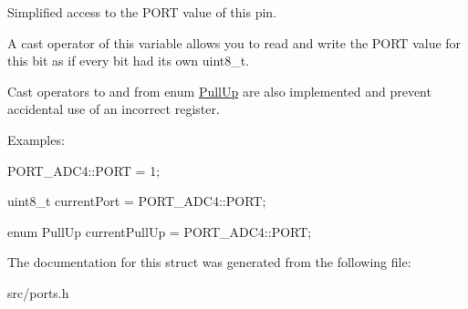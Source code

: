 Simplified access to the P\+O\+RT value of this pin. 

A cast operator of this variable allows you to read and write the P\+O\+RT value for this bit as if every bit had its own uint8\+\_\+t.

Cast operators to and from enum \hyperlink{namespaceALIBVR__NAMESPACE__PREFIXports_ae4be55f1d106e37c89f38c66f674b53a}{Pull\+Up} are also implemented and prevent accidental use of an incorrect register.

Examples\+:


\begin{DoxyItemize}
\item {\ttfamily P\+O\+R\+T\+\_\+\+A\+D\+C4\+::\+P\+O\+RT = 1;}
\item {\ttfamily uint8\+\_\+t current\+Port = P\+O\+R\+T\+\_\+\+A\+D\+C4\+::\+P\+O\+RT;}
\item {\ttfamily enum Pull\+Up current\+Pull\+Up = P\+O\+R\+T\+\_\+\+A\+D\+C4\+::\+P\+O\+RT;} 
\end{DoxyItemize}

The documentation for this struct was generated from the following file\+:\begin{DoxyCompactItemize}
\item 
src/ports.\+h\end{DoxyCompactItemize}
